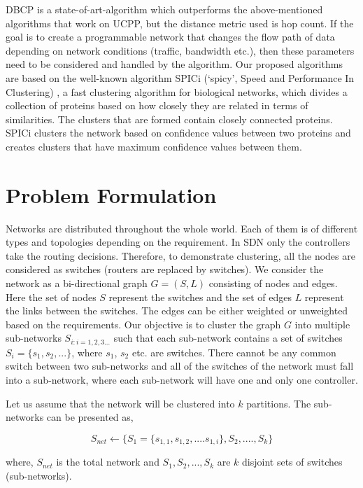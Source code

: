 \documentclass[times]{dacauth}
\begin{document}
DBCP is a state-of-art-algorithm which outperforms the above-mentioned algorithms that work on UCPP, but the distance metric used is hop count. If the goal is to create a programmable network that changes the flow path of data depending on network conditions (traffic, bandwidth etc.), then these parameters need to be considered and handled by the algorithm.
Our proposed algorithms are based on the well-known algorithm SPICi (‘spicy’, Speed and Performance In Clustering) \cite{spici2010}, a fast clustering algorithm for biological networks, which divides a collection of proteins based on how closely they are related in terms of similarities\cite{protein2005palla}. The clusters that are formed contain closely connected proteins. SPICi clusters the network based on confidence values between two proteins and creates clusters that have maximum confidence values between them.

\section{Problem Formulation} \label{problemformulation}

Networks are distributed throughout the whole world. Each of them is of different types and topologies depending on the requirement. In SDN only the controllers take the routing decisions. Therefore, to demonstrate clustering, all the nodes are considered as switches (routers are replaced by switches). We consider the network as a bi-directional graph $G=(S,L)$ consisting of nodes and edges. Here the set of nodes $S$ represent the switches and the set of edges $L$ represent the links between the switches. The edges can be either weighted or unweighted based on the requirements. Our objective is to cluster the graph $G$ into multiple sub-networks $S_{i:i=1,2,3...}$ such that each sub-network contains a set of switches $S_i=\{s_1,s_2,...\}$, where $s_1$, $s_2$ etc. are switches. There cannot be any common switch between two sub-networks and all of the switches of the network must fall into a sub-network, where each sub-network will have one and only one controller.

Let us assume that the network will be clustered into $k$ partitions. The sub-networks can be presented as,

\begin{equation} \label {eqn:clustering}
S_{net} \gets \{S_1=\{s_{1,1},s_{1,2},....s_{1,i}\},S_2,....,S_k\}
\end{equation}

where, $S_{net}$ is the total network and $S_1,S_2,...,S_k$ are $k$ disjoint sets of switches (sub-networks).
\end{document}
